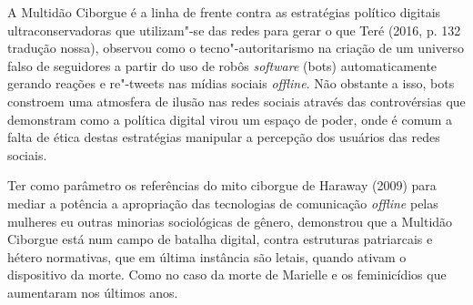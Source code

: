 A Multidão Ciborgue é a linha de frente contra as estratégias político
digitais ultraconservadoras que utilizam"-se das redes para gerar o que
Teré (2016, p. 132 tradução nossa), observou como o tecno"-autoritarismo
na criação de um universo falso de seguidores a partir do uso de robôs
\emph{\emph{software}} (bots) automaticamente gerando reações e re"-tweets nas mídias
sociais \emph{offline}. Não obstante a isso, bots constroem uma atmosfera de
ilusão nas redes sociais através das controvérsias que demonstram como a
política digital virou um espaço de poder, onde é comum a falta de ética
destas estratégias manipular a percepção dos usuários das redes sociais.

Ter como parâmetro os referências do mito ciborgue de Haraway (2009)
para mediar a potência a apropriação das tecnologias de comunicação
\emph{offline} pelas mulheres eu outras minorias sociológicas de gênero,
demonstrou que a Multidão Ciborgue está num campo de batalha digital,
contra estruturas patriarcais e hétero normativas, que em última
instância são letais, quando ativam o dispositivo da morte. Como no caso
da morte de Marielle e os feminicídios que aumentaram nos últimos anos.


